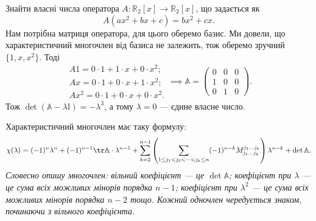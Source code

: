 \documentclass{math_library}
\begin{document}
\begin{example}
Знайти власні числа оператора $A \colon \mathbb{R}_2[x] \to \mathbb{R}_2[x]$, що задається як
\[
A(ax^2+bx+c) = bx^2 + cx.
\]
Нам потрібна матриця оператора, для цього оберемо базис. Ми довели, що характеристичний многочлен від базиса не залежить, тож оберемо зручний $\{1,x,x^2\}$. Тоді
\[
\begin{gathered} A1 = 0 \cdot 1 + 1 \cdot x + 0 \cdot x^2; \\ Ax = 0 \cdot 1 + 0 \cdot x + 1 \cdot x^2; \\ Ax^2 = 0 \cdot 1 + 0 \cdot x + 0 \cdot x^2. \end{gathered} \implies \mathbb{A} = \begin{pmatrix}
0 & 0 & 0 \\
1 & 0 & 0 \\
0 & 1 & 0
\end{pmatrix}.
\]
Тож $\det (\mathbb{A}-\lambda \mathbb{I}) = -\lambda^3$, а тому $\lambda = 0$ --- єдине власне число.
\end{example}

\begin{theorem}
Характеристичний многочлен має таку формулу:
\begin{align*}
\chi(\lambda) = \displaystyle (-1)^n \lambda^n + (-1)^{n-1} \tr \mathbb{A} \cdot \lambda^{n-1} + \sum_{k=2}^{n-1} \left( \sum_{1 \leq j_1 < j_2 < \dots < j_k \leq n} (-1)^{n-k} M_{j_1 \dots j_k}^{j_1 \dots j_k} \right) \lambda^{n-k} + \det \mathbb{A}.
\end{align*}
\textit{Словесно опишу многочлен: вільний коефіцієнт --- це $\det \mathbb{A}$; коефіцієнт при $\lambda$ --- це сума всіх можливих мінорів порядка $n-1$; коефіцієнт при $\lambda^2$ --- це сума всіх можливих мінорів порядка $n-2$ тощо. Кожний одночлен чередується знаком, починаючи з вільного коефіцієнта.}
\end{theorem}
\end{document}
